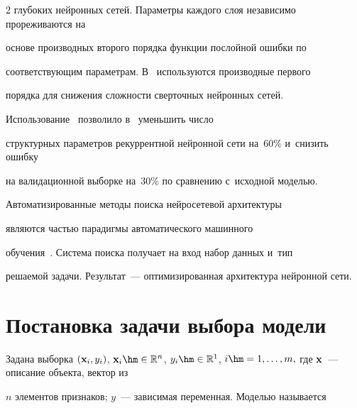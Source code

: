 \begin{multicols}{2}
глубоких нейронных сетей. Параметры каждого слоя независимо  прореживаются на 


основе производных второго порядка функции послойной ошибки по 


соответствующим па\-ра\-мет\-рам. В~\cite{ten} используются производные первого 


порядка для снижения слож\-ности сверточных нейронных сетей. 


Использование~\cite{second} позволило в~\cite{eleven} уменьшить чис\-ло 


структурных параметров рекуррентной нейронной сети на~$60\%$ и~снизить ошибку 


на валидационной выборке на~$30\%$ по сравнению с~исходной моделью. 


Автоматизированные методы поиска нейросетевой архитектуры~\cite{twentyone} 


являются \mbox{частью} парадигмы автоматического машинного 


обучения~\cite{twentytwo}. Сис\-те\-ма поиска получает на вход набор данных и~тип 


решаемой задачи. Результат~--- оптимизированная архитектура нейронной сети.


















\section{Постановка задачи выбора модели}





Задана выборка $(\xb_i,y_i)$, $\xb_i \hm\in \mathbb{R}^n$, $y_i\hm\in 


\mathbb{R}^1$, $i\hm=1,\dots,m,$ где $\xb$~--- описание объекта, вектор из 


$n$ элементов признаков; $y$~--- зависимая переменная. Моделью называется 



\end{multicols}
